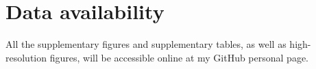 
% 

{
\chapter*{Data availability}
\label{data_availability}
}

All the supplementary figures and supplementary tables, as well as high-resolution figures, will be accessible online at my GitHub personal page.

% 